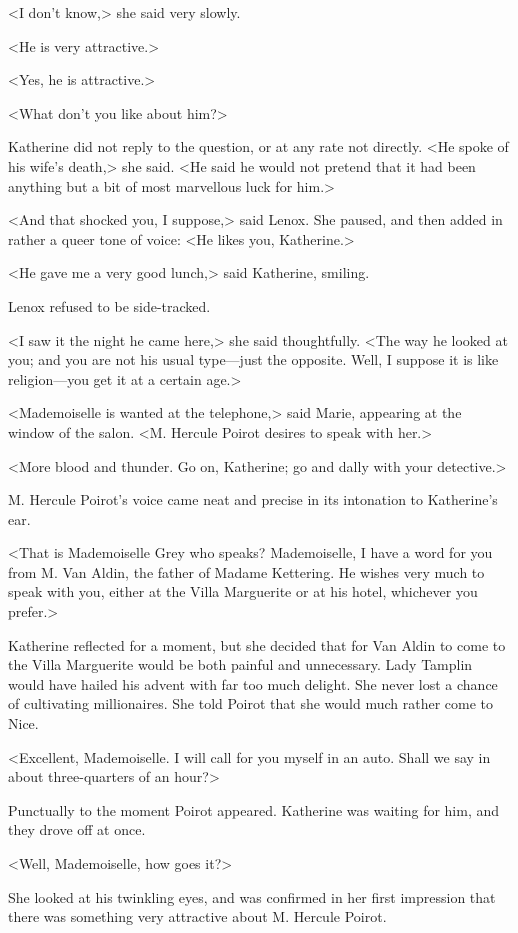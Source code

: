 <I don't know,> she said very slowly.

<He is very attractive.>

<Yes, he is attractive.>

<What don't you like about him?>

Katherine did not reply to the question, or at any rate not directly. <He spoke of his wife's death,> she said. <He said he would not pretend that it had been anything but a bit of most marvellous luck for him.>

<And that shocked you, I suppose,> said Lenox. She paused, and then added in rather a queer tone of voice: <He likes you, Katherine.>

<He gave me a very good lunch,> said Katherine, smiling.

Lenox refused to be side-tracked.

<I saw it the night he came here,> she said thoughtfully. <The way he looked at you; and you are not his usual type—just the opposite. Well, I suppose it is like religion—you get it at a certain age.>

<Mademoiselle is wanted at the telephone,> said Marie, appearing at the window of the salon. <M. Hercule Poirot desires to speak with her.>

<More blood and thunder. Go on, Katherine; go and dally with your detective.>

M. Hercule Poirot's voice came neat and precise in its intonation to Katherine's ear.

<That is Mademoiselle Grey who speaks?  Mademoiselle, I have a word for you from M. Van Aldin, the father of Madame Kettering. He wishes very much to speak with you, either at the Villa Marguerite or at his hotel, whichever you prefer.>

Katherine reflected for a moment, but she decided that for Van Aldin to come to the Villa Marguerite would be both painful and unnecessary. Lady Tamplin would have hailed his advent with far too much delight. She never lost a chance of cultivating millionaires. She told Poirot that she would much rather come to Nice.

<Excellent, Mademoiselle. I will call for you myself in an auto. Shall we say in about three-quarters of an hour?>

Punctually to the moment Poirot appeared. Katherine was waiting for him, and they drove off at once.

<Well, Mademoiselle, how goes it?>

She looked at his twinkling eyes, and was confirmed in her first impression that there was something very attractive about M. Hercule Poirot.

